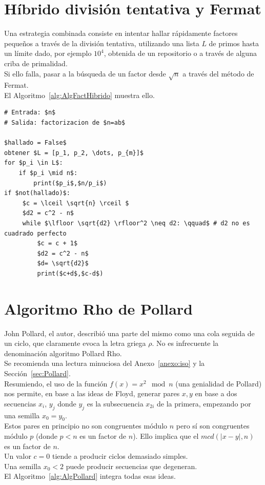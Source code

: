 \section{Híbrido división tentativa y Fermat}
Una estrategia combinada consiste en intentar hallar rápidamente factores pequeños a través de la división tentativa, utilizando una lista $L$ de primos hasta un límite dado, por ejemplo $10^4$, obtenida de un repositorio o a través de alguna criba de primalidad. \\
Si ello falla, pasar a la búsqueda de un factor desde $\sqrt{n}$ a través del método de Fermat. \\

El Algoritmo~\ref{alg:AlgFactHibrido} muestra ello.

\begin{lstlisting}[caption={Algoritmo Híbrido}, label={alg:AlgFactHibrido}, mathescape=true]
# Entrada: $n$
# Salida: factorizacion de $n=ab$

$hallado = False$
obtener $L = [p_1, p_2, \dots, p_{m}]$
for $p_i \in L$:
    if $p_i \mid n$:
        print($p_i$,$n/p_i$)
if $not(hallado)$:  
     $c = \lceil \sqrt{n} \rceil $
     $d2 = c^2 - n$
     while $\lfloor \sqrt{d2} \rfloor^2 \neq d2: \qquad$ # d2 no es cuadrado perfecto
         $c = c + 1$
         $d2 = c^2 - n$
         $d= \sqrt{d2}$
         print($c+d$,$c-d$)
\end{lstlisting}

\section{Algoritmo Rho de Pollard}
John Pollard, el autor, describió una parte del mismo como una cola seguida de un ciclo, que claramente evoca la letra griega $\rho$. No es infrecuente la denominación algoritmo Pollard Rho. \\

Se recomienda una lectura minuciosa del Anexo~\ref{anexo:iso} y la Sección~\ref{sec:Pollard}. \\
Resumiendo, el uso de la función $f(x) = x^2 \mod n$ (una genialidad de Pollard) nos permite, en base a las ideas de Floyd, generar pares $x,y$ en base a dos secuencias $x_i$, $y_j$ donde $y_j$ es la subsecuencia $x_{2i}$ de la primera, empezando por una semilla $x_0=y_0$.\\
Estos pares en principio no son congruentes módulo $n$ pero sí son congruentes módulo $p$ (donde $p < n$ es un factor de $n$). Ello implica que el $mcd(|x-y|,n)$ es un factor de $n$. \\
Un valor $c=0$ tiende a producir ciclos demasiado simples. \\
Una semilla $x_0<2$ puede producir secuencias que degeneran. \\
El Algoritmo~\ref{alg:AlgPollard} integra todas esas ideas.

